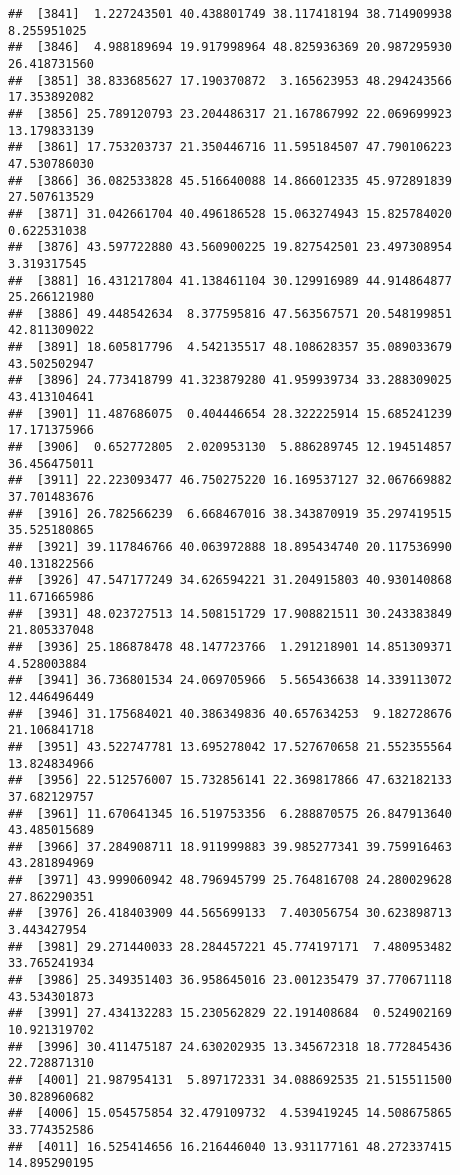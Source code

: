 \documentclass[
]{article}
\begin{document}
\begin{verbatim}
##  [3841]  1.227243501 40.438801749 38.117418194 38.714909938  8.255951025
##  [3846]  4.988189694 19.917998964 48.825936369 20.987295930 26.418731560
##  [3851] 38.833685627 17.190370872  3.165623953 48.294243566 17.353892082
##  [3856] 25.789120793 23.204486317 21.167867992 22.069699923 13.179833139
##  [3861] 17.753203737 21.350446716 11.595184507 47.790106223 47.530786030
##  [3866] 36.082533828 45.516640088 14.866012335 45.972891839 27.507613529
##  [3871] 31.042661704 40.496186528 15.063274943 15.825784020  0.622531038
##  [3876] 43.597722880 43.560900225 19.827542501 23.497308954  3.319317545
##  [3881] 16.431217804 41.138461104 30.129916989 44.914864877 25.266121980
##  [3886] 49.448542634  8.377595816 47.563567571 20.548199851 42.811309022
##  [3891] 18.605817796  4.542135517 48.108628357 35.089033679 43.502502947
##  [3896] 24.773418799 41.323879280 41.959939734 33.288309025 43.413104641
##  [3901] 11.487686075  0.404446654 28.322225914 15.685241239 17.171375966
##  [3906]  0.652772805  2.020953130  5.886289745 12.194514857 36.456475011
##  [3911] 22.223093477 46.750275220 16.169537127 32.067669882 37.701483676
##  [3916] 26.782566239  6.668467016 38.343870919 35.297419515 35.525180865
##  [3921] 39.117846766 40.063972888 18.895434740 20.117536990 40.131822566
##  [3926] 47.547177249 34.626594221 31.204915803 40.930140868 11.671665986
##  [3931] 48.023727513 14.508151729 17.908821511 30.243383849 21.805337048
##  [3936] 25.186878478 48.147723766  1.291218901 14.851309371  4.528003884
##  [3941] 36.736801534 24.069705966  5.565436638 14.339113072 12.446496449
##  [3946] 31.175684021 40.386349836 40.657634253  9.182728676 21.106841718
##  [3951] 43.522747781 13.695278042 17.527670658 21.552355564 13.824834966
##  [3956] 22.512576007 15.732856141 22.369817866 47.632182133 37.682129757
##  [3961] 11.670641345 16.519753356  6.288870575 26.847913640 43.485015689
##  [3966] 37.284908711 18.911999883 39.985277341 39.759916463 43.281894969
##  [3971] 43.999060942 48.796945799 25.764816708 24.280029628 27.862290351
##  [3976] 26.418403909 44.565699133  7.403056754 30.623898713  3.443427954
##  [3981] 29.271440033 28.284457221 45.774197171  7.480953482 33.765241934
##  [3986] 25.349351403 36.958645016 23.001235479 37.770671118 43.534301873
##  [3991] 27.434132283 15.230562829 22.191408684  0.524902169 10.921319702
##  [3996] 30.411475187 24.630202935 13.345672318 18.772845436 22.728871310
##  [4001] 21.987954131  5.897172331 34.088692535 21.515511500 30.828960682
##  [4006] 15.054575854 32.479109732  4.539419245 14.508675865 33.774352586
##  [4011] 16.525414656 16.216446040 13.931177161 48.272337415 14.895290195

\end{verbatim}
\end{document}
